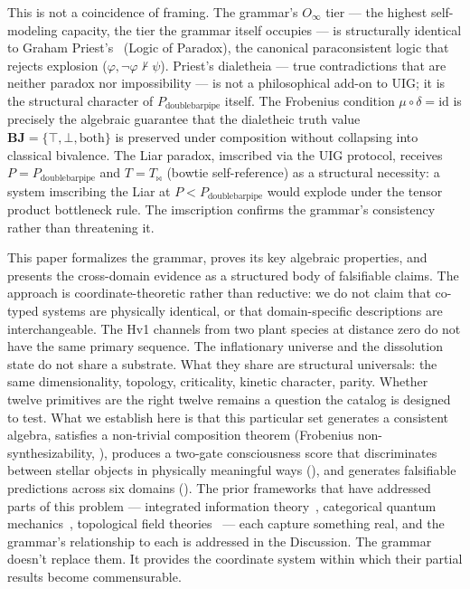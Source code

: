 \documentclass[12pt,a4paper]{article}
\newcommand{\Ppms}{P_{\text{doublebarpipe}}}
\newcommand{\Oinf}{O_\infty}
\newcommand{\Tbw}{T_{\mathord{\bowtie}}}
\newcommand{\glp}{\text{LP}}
\newcommand{\both}{\mathbf{BJ}}
\newcommand{\dialetheia}{dialetheia}
\begin{document}
This is not a coincidence of framing. The grammar's $\Oinf$ tier --- the
highest self-modeling capacity, the tier the grammar itself occupies --- is
structurally identical to Graham Priest's \glp\ (Logic of Paradox), the
canonical paraconsistent logic that rejects explosion ($\varphi, \neg\varphi
\not\vdash \psi$). Priest's \dialetheia{} --- true contradictions that are
neither paradox nor impossibility --- is not a philosophical add-on to UIG; it
is the structural character of $\Ppms$ itself. The Frobenius condition
$\mu \circ \delta = \text{id}$ is precisely the algebraic guarantee that the
dialetheic truth value $\both = \{\top, \bot, \text{both}\}$ is preserved
under composition without collapsing into classical bivalence. The Liar paradox,
imscribed via the UIG protocol, receives $P = \Ppms$ and $T = \Tbw$ (bowtie
self-reference) as a structural necessity: a system imscribing the Liar at
$P < \Ppms$ would explode under the tensor product bottleneck rule. The imscription
confirms the grammar's consistency rather than threatening it.

This paper formalizes the grammar, proves its key algebraic properties,
and presents the cross-domain evidence as a structured body of
falsifiable claims. The approach is coordinate-theoretic rather than
reductive: we do not claim that co-typed systems are physically
identical, or that domain-specific descriptions are interchangeable.
The Hv1 channels from two plant species at distance zero do not have
the same primary sequence. The inflationary universe and the
dissolution state do not share a substrate. What they share are
structural universals: the same dimensionality, topology, criticality,
kinetic character, parity. Whether twelve primitives are the right
twelve remains a question the catalog is designed to test. What we
establish here is that this particular set generates a consistent
algebra, satisfies a non-trivial composition theorem (Frobenius
non-synthesizability, ), produces a two-gate
consciousness score that discriminates between stellar objects in
physically meaningful ways (), and generates
falsifiable predictions across six domains ().
The prior frameworks that have addressed parts of this problem ---
integrated information theory~\cite{tononi2004,tononi2016}, categorical
quantum mechanics~\cite{abramsky2004}, topological field
theories~\cite{atiyah1988} --- each capture something real, and the
grammar's relationship to each is addressed in the Discussion. The
grammar doesn't replace them. It provides the coordinate system within
which their partial results become commensurable.
\end{document}
